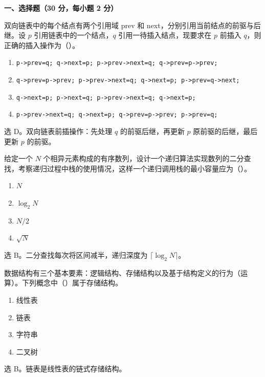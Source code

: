 
\textbf{一、选择题（30 分，每小题 2 分）}

\begin{question}
双向链表中的每个结点有两个引用域 prev 和 next，分别引用当前结点的前驱与后继。设 $p$ 引用链表中的一个结点，$q$ 引用一待插入结点，现要求在 $p$ 前插入 $q$，则正确的插入操作为（\quad）。
\begin{enumerate}
  \item \texttt{p->prev=q; q->next=p; p->prev->next=q; q->prev=p->prev;}
  \item \texttt{q->prev=p->prev; p->prev->next=q; q->next=p; p->prev=q->next;}
  \item \texttt{q->next=p; p->next=q; p->prev->next=q; q->next=p;}
  \item \texttt{p->prev->next=q; q->next=p; q->prev=p->prev; p->prev=q;}
\end{enumerate}
\begin{solution}
选 D。双向链表前插操作：先处理 $q$ 的前驱后继，再更新 $p$ 原前驱的后继，最后更新 $p$ 的前驱。
\end{solution}
\end{question}

\begin{question}
给定一个 $N$ 个相异元素构成的有序数列，设计一个递归算法实现数列的二分查找，考察递归过程中栈的使用情况，这样一个递归调用栈的最小容量应为（\quad）。
\begin{enumerate}
  \item $N$
  \item $\log_2 N$
  \item $N/2$
  \item $\sqrt{N}$
\end{enumerate}
\begin{solution}
选 B。二分查找每次将区间减半，递归深度为 $\lceil\log_2 N\rceil$。
\end{solution}
\end{question}

\begin{question}
数据结构有三个基本要素：逻辑结构、存储结构以及基于结构定义的行为（运算）。下列概念中（\quad）属于存储结构。
\begin{enumerate}
  \item 线性表
  \item 链表
  \item 字符串
  \item 二叉树
\end{enumerate}
\begin{solution}
选 B。链表是线性表的链式存储结构。
\end{solution}
\end{question}

